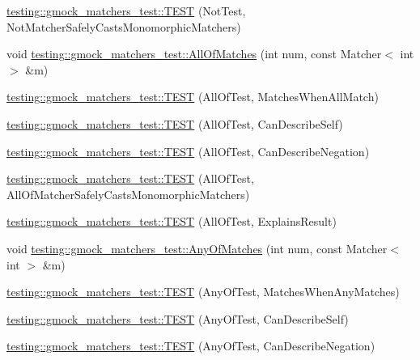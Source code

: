 \begin{DoxyCompactItemize}
\item 
\hyperlink{namespacetesting_1_1gmock__matchers__test_a46849e0c019e331f830ed91137fa417a}{testing\+::gmock\+\_\+matchers\+\_\+test\+::\+T\+E\+ST} (Not\+Test, Not\+Matcher\+Safely\+Casts\+Monomorphic\+Matchers)
\item 
void \hyperlink{namespacetesting_1_1gmock__matchers__test_a51d8731c3824a6acdaa594645dd46779}{testing\+::gmock\+\_\+matchers\+\_\+test\+::\+All\+Of\+Matches} (int num, const Matcher$<$ int $>$ \&m)
\item 
\hyperlink{namespacetesting_1_1gmock__matchers__test_a7714d041eb2dd2e233db7f175fedef5a}{testing\+::gmock\+\_\+matchers\+\_\+test\+::\+T\+E\+ST} (All\+Of\+Test, Matches\+When\+All\+Match)
\item 
\hyperlink{namespacetesting_1_1gmock__matchers__test_a31056975d89eea2786997cf18b086bf4}{testing\+::gmock\+\_\+matchers\+\_\+test\+::\+T\+E\+ST} (All\+Of\+Test, Can\+Describe\+Self)
\item 
\hyperlink{namespacetesting_1_1gmock__matchers__test_a86c15b3bc163321c7a56aeb0b1709b87}{testing\+::gmock\+\_\+matchers\+\_\+test\+::\+T\+E\+ST} (All\+Of\+Test, Can\+Describe\+Negation)
\item 
\hyperlink{namespacetesting_1_1gmock__matchers__test_a4196a4000390e2378954d55b4f6d2893}{testing\+::gmock\+\_\+matchers\+\_\+test\+::\+T\+E\+ST} (All\+Of\+Test, All\+Of\+Matcher\+Safely\+Casts\+Monomorphic\+Matchers)
\item 
\hyperlink{namespacetesting_1_1gmock__matchers__test_a2b9f4a791dd4f1fb9f8a1400883a5db4}{testing\+::gmock\+\_\+matchers\+\_\+test\+::\+T\+E\+ST} (All\+Of\+Test, Explains\+Result)
\item 
void \hyperlink{namespacetesting_1_1gmock__matchers__test_aa4e9deb0a98413e62516451e7c060c7a}{testing\+::gmock\+\_\+matchers\+\_\+test\+::\+Any\+Of\+Matches} (int num, const Matcher$<$ int $>$ \&m)
\item 
\hyperlink{namespacetesting_1_1gmock__matchers__test_a4949d40a1ac77182274189c21848af00}{testing\+::gmock\+\_\+matchers\+\_\+test\+::\+T\+E\+ST} (Any\+Of\+Test, Matches\+When\+Any\+Matches)
\item 
\hyperlink{namespacetesting_1_1gmock__matchers__test_a00bd490bf974b3f3485a1b0fde9fa490}{testing\+::gmock\+\_\+matchers\+\_\+test\+::\+T\+E\+ST} (Any\+Of\+Test, Can\+Describe\+Self)
\item 
\hyperlink{namespacetesting_1_1gmock__matchers__test_acc5e849e0765f00a48581e9480f3c8e2}{testing\+::gmock\+\_\+matchers\+\_\+test\+::\+T\+E\+ST} (Any\+Of\+Test, Can\+Describe\+Negation)

\end{DoxyCompactItemize}

